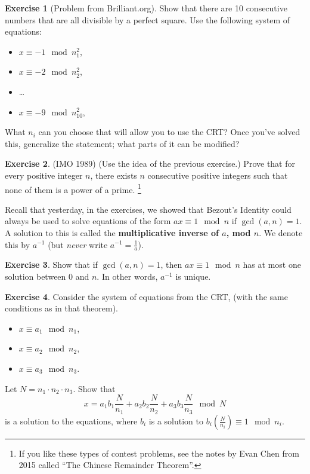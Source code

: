 \documentclass[11pt]{article}
\theoremstyle{definition}
\newtheorem{exercise}{Exercise}
\numberwithin{thm}{section}
\begin{document}
\begin{exercise} [Problem from Brilliant.org] Show that there are 10 consecutive numbers that are all divisible by a perfect square. Use the following system of equations:
\begin{itemize}
	\item $x \equiv -1 \mod n_1^2$,
    \item $x \equiv -2 \mod n_2^2$,
    \item \ldots
    \item $x \equiv -9 \mod n_{10}^2$,
\end{itemize}
What $n_i$ can you choose that will allow you to use the CRT? Once you've solved this, generalize the statement; what parts of it can be modified?
\end{exercise}

\begin{exercise} (IMO  1989) (Use the idea of the previous exercise.) Prove  that  for  every  positive  integer $n$, there  exists $n$ consecutive positive integers such that none of them is a power of a prime. \footnote{If you like these types of contest problems, see the notes by Evan Chen from 2015 called ``The Chinese Remainder Theorem''.}
\end{exercise}

Recall that yesterday, in the exercises, we showed that Bezout's Identity could always be used to solve equations of the form $ax \equiv 1 \mod n$ if $\gcd(a,n) = 1$. A solution to this is called the \textbf{multiplicative inverse of $a$, mod $n$}. We denote this by $a^{-1}$ (but \textit{never} write $a^{-1} = \frac{1}{a}$).

\begin{exercise} Show that if $\gcd(a,n) = 1$, then $ax \equiv 1 \mod n$ has at most one solution between $0$ and $n$. In other words, $a^{-1}$ is unique.
\end{exercise}

\begin{exercise} Consider the system of equations from the CRT, (with the same conditions as in that theorem).
\begin{itemize}
	\item $x \equiv a_1 \mod n_1$,
    \item $x \equiv a_2 \mod n_2$,
    \item $x \equiv a_3 \mod n_3$.
\end{itemize}
Let $N = n_1 \cdot n_2 \cdot n_3$. Show that
\[
	x = a_1 b_1 \frac{N}{n_1} + a_2 b_2 \frac{N}{n_2} + a_3 b_3 \frac{N}{n_3} \mod N
\]
is a solution to the equations, where $b_i$ is a solution to $b_i \left( \frac{N}{n_i}\right) \equiv 1 \mod n_i$.
\end{exercise}
\end{document}
